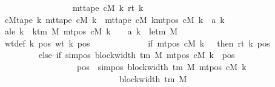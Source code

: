\begin{isabellebody}
\ \ \ \ \ \ \ \ \ \ \ \ \ \ \ \ \ \ \ \ \ \ \ {\isacharparenleft}{\kern0pt}mt{\isacharunderscore}{\kern0pt}tape\ cM\ k{\isacharparenright}{\kern0pt}\ {\isacharparenleft}{\kern0pt}rt\ k{\isacharparenright}{\kern0pt}{\isachardoublequoteclose}\isanewline
\ \ \ \ \ \ \ cM{}tape{\isacharcolon}{\kern0pt}\ {\isachardoublequoteopen}{\isasymAnd}k{\isachardot}{\kern0pt}\ mt{\isacharunderscore}{\kern0pt}tape\ cM{\isacharunderscore}{\kern0pt}{}\ k\ {\isacharequal}{\kern0pt}\ {\isacharparenleft}{\kern0pt}mt{\isacharunderscore}{\kern0pt}tape\ cM\ k{\isacharparenright}{\kern0pt}{\isacharparenleft}{\kern0pt}mt{\isacharunderscore}{\kern0pt}pos\ cM\ k\ {\isacharcolon}{\kern0pt}{\isacharequal}{\kern0pt}\ a{\isacharprime}{\kern0pt}\ k{\isacharparenright}{\kern0pt}{\isachardoublequoteclose}\isanewline
\ \ \ \ \ \ \ a{\isacharprime}{\kern0pt}le{}{\isacharcolon}{\kern0pt}\ {\isachardoublequoteopen}{\isasymforall}k\ {\isacharless}{\kern0pt}\ k{\isacharunderscore}{\kern0pt}tm\ M{\isachardot}{\kern0pt}\ mt{\isacharunderscore}{\kern0pt}pos\ cM\ k\ {\isacharequal}{\kern0pt}\ {}\ {\isasymlongrightarrow}\ a{\isacharprime}{\kern0pt}\ k\ {\isacharequal}{\kern0pt}\ le{\isacharunderscore}{\kern0pt}tm\ M{\isachardoublequoteclose}\isanewline
\ \ \ \ \ \ \ wt{\isacharunderscore}{\kern0pt}def{\isacharcolon}{\kern0pt}\ {\isachardoublequoteopen}{\isasymAnd}k\ pos{\isachardot}{\kern0pt}\ wt\ k\ pos\isanewline
\ \ \ \ \ \ \ \ \ \ \ \ {\isacharequal}{\kern0pt}\ {\isacharparenleft}{\kern0pt}if\ mt{\isacharunderscore}{\kern0pt}pos\ cM\ k\ {\isacharequal}{\kern0pt}\ {}\ then\ rt\ k\ pos\isanewline
\ \ \ \ \ \ \ \ \ \ \ \ \ \ \ else\ if\ sim{\isacharunderscore}{\kern0pt}pos\ {\isacharparenleft}{\kern0pt}block{\isacharunderscore}{\kern0pt}width\ {\isacharparenleft}{\kern0pt}{\isasymGamma}{\isacharunderscore}{\kern0pt}tm\ M{\isacharparenright}{\kern0pt}{\isacharparenright}{\kern0pt}\ {\isacharparenleft}{\kern0pt}mt{\isacharunderscore}{\kern0pt}pos\ cM\ k{\isacharparenright}{\kern0pt}\ {\isasymle}\ pos\isanewline
\ \ \ \ \ \ \ \ \ \ \ \ \ \ \ \ \ \ \ \ \ \ \ {\isasymand}\ pos\ {\isacharless}{\kern0pt}\ sim{\isacharunderscore}{\kern0pt}pos\ {\isacharparenleft}{\kern0pt}block{\isacharunderscore}{\kern0pt}width\ {\isacharparenleft}{\kern0pt}{\isasymGamma}{\isacharunderscore}{\kern0pt}tm\ M{\isacharparenright}{\kern0pt}{\isacharparenright}{\kern0pt}\ {\isacharparenleft}{\kern0pt}mt{\isacharunderscore}{\kern0pt}pos\ cM\ k{\isacharparenright}{\kern0pt}\isanewline
\ \ \ \ \ \ \ \ \ \ \ \ \ \ \ \ \ \ \ \ \ \ \ \ \ \ \ \ \ \ \ \ \ {\isacharplus}{\kern0pt}\ block{\isacharunderscore}{\kern0pt}width\ {\isacharparenleft}{\kern0pt}{\isasymGamma}{\isacharunderscore}{\kern0pt}tm\ M{\isacharparenright}{\kern0pt}\isanewline

\end{isabellebody}
